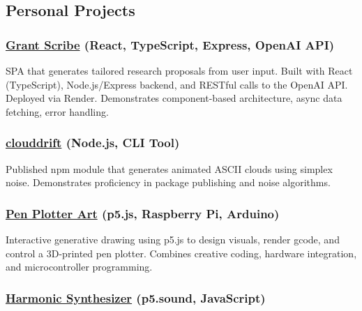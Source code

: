 \documentclass[10pt,a4paper]{article}
\begin{document}
\subsection{Personal Projects}\label{personal-projects}

\subsubsection{\texorpdfstring{\href{https://granter.onrender.com/}{Grant
Scribe} (React, TypeScript, Express, OpenAI
API)}{Grant Scribe (React, TypeScript, Express, OpenAI API)}}\label{grant-scribe-react-typescript-express-openai-api}

SPA that generates tailored research proposals from user input. Built
with React (TypeScript), Node.js/Express backend, and RESTful calls to
the OpenAI API. Deployed via Render. Demonstrates component-based
architecture, async data fetching, error handling.

\subsubsection{\texorpdfstring{\href{https://github.com/thrly/clouddrift}{clouddrift}
(Node.js, CLI
Tool)}{clouddrift (Node.js, CLI Tool)}}\label{clouddrift-node.js-cli-tool}

Published npm module that generates animated ASCII clouds using simplex
noise. Demonstrates proficiency in package publishing and noise
algorithms.

\subsubsection{\texorpdfstring{\href{https://github.com/thrly/pen-plotter-resources}{Pen
Plotter Art} (p5.js, Raspberry Pi,
Arduino)}{Pen Plotter Art (p5.js, Raspberry Pi, Arduino)}}\label{pen-plotter-art-p5.js-raspberry-pi-arduino}

Interactive generative drawing using p5.js to design visuals, render
gcode, and control a 3D-printed pen plotter. Combines creative coding,
hardware integration, and microcontroller programming.

\subsubsection{\texorpdfstring{\href{https://github.com/thrly/harmonic-series-synth}{Harmonic
Synthesizer} (p5.sound,
JavaScript)}{Harmonic Synthesizer (p5.sound, JavaScript)}}\label{harmonic-synthesizer-p5.sound-javascript}
\end{document}
